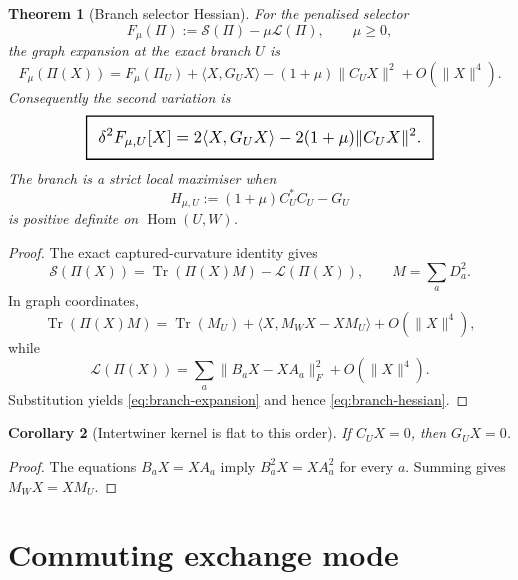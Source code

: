 \documentclass[11pt,a4paper]{article}
\numberwithin{equation}{section}
\DeclareMathOperator{\Tr}{Tr}
\newcommand{\geomboxed}[1]{%
  \setlength{\fboxsep}{8pt}%
  \setlength{\fboxrule}{0.9pt}%
  \fbox{\scalebox{1.18}{$\displaystyle #1$}}%
}
\theoremstyle{thmcompact}
\newtheorem{theorem}{Theorem}[section]
\newtheorem{corollary}[theorem]{Corollary}
\theoremstyle{remark}
\begin{document}
\begin{theorem}[Branch selector Hessian]
\label{thm:branch-selector-hessian}
For the penalised selector
\[
F_\mu(\Pi):=\mathcal S(\Pi)-\mu\mathcal L(\Pi),
\qquad \mu\ge0,
\]
the graph expansion at the exact branch $U$ is
\begin{equation}
F_\mu(\Pi(X))
=F_\mu(\Pi_U)+\langle X,G_UX\rangle-(1+\mu)\|C_UX\|^2+O(\|X\|^4).
\label{eq:branch-expansion}
\end{equation}
Consequently the second variation is
\begin{equation}
\geomboxed{
\delta^2F_{\mu,U}[X]
=2\langle X,G_UX\rangle-2(1+\mu)\|C_UX\|^2.
}
\label{eq:branch-hessian}
\end{equation}
The branch is a strict local maximiser when
\begin{equation}
H_{\mu,U}:=(1+\mu)C_U^*C_U-G_U
\label{eq:selector-gap}
\end{equation}
is positive definite on $\operatorname{Hom}(U,W)$.
\end{theorem}

\begin{proof}
The exact captured-curvature identity gives
\[
\mathcal S(\Pi(X))=\Tr(\Pi(X)M)-\mathcal L(\Pi(X)),
\qquad M=\sum_aD_a^2.
\]
In graph coordinates,
\[
\Tr(\Pi(X)M)=\Tr(M_U)+\langle X,M_WX-XM_U\rangle+O(\|X\|^4),
\]
while
\[
\mathcal L(\Pi(X))=\sum_a\|B_aX-XA_a\|_F^2+O(\|X\|^4).
\]
Substitution yields \eqref{eq:branch-expansion} and hence \eqref{eq:branch-hessian}.
\end{proof}

\begin{corollary}[Intertwiner kernel is flat to this order]
\label{cor:intertwiner-kernel}
If $C_UX=0$, then $G_UX=0$.
\end{corollary}

\begin{proof}
The equations $B_aX=XA_a$ imply $B_a^2X=XA_a^2$ for every $a$. Summing gives $M_WX=XM_U$.
\end{proof}

\section{Commuting exchange mode}
\end{document}
